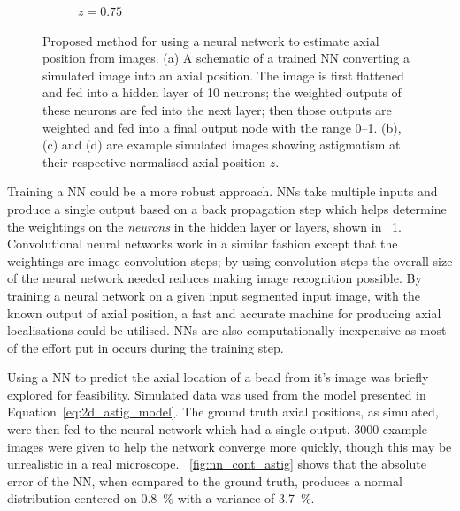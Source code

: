 \begin{figure}
\begin{subfigure}[t]{0.2\linewidth}
        \caption{\(z=0.75\)}
    \end{subfigure}
    \caption[Proposed method for using a neural network to estimate axial position from images.]{
    Proposed method for using a neural network to estimate axial position from images.
    (a) A schematic of a trained \gls{NN} converting a simulated image into an axial position.
    The image is first flattened and fed into a hidden layer of 10 neurons;
    the weighted outputs of these neurons are fed into the next layer;
    then those outputs are weighted and fed into a final output node with the range \SIrange{0}{1}{}.
    (b), (c) and (d) are example simulated images showing astigmatism at their respective normalised axial position \(z\).
    }\label{fig:nn_astig_scheme}
\end{figure}

Training a \gls{NN} could be a more robust approach.
\gls{NN}s take multiple inputs and produce a single output based on a back propagation step which helps determine the weightings on the \emph{neurons} in the hidden layer or layers, shown in \figurename~\ref{fig:nn_astig_scheme}.
Convolutional neural networks work in a similar fashion except that the weightings are image convolution steps; by using convolution steps the overall size of the neural network needed reduces making image recognition possible.
By training a neural network on a given input segmented input image, with the known output of axial position, a fast and accurate machine for producing axial localisations could be utilised.
\gls{NN}s are also computationally inexpensive as most of the effort put in occurs during the training step.

Using a \gls{NN} to predict the axial location of a bead from it's image was briefly explored for feasibility.
Simulated data was used from the model presented in Equation~\eqref{eq:2d_astig_model}.
The ground truth axial positions, as simulated, were then fed to the neural network which had a single output.
3000 example images were given to help the network converge more quickly, though this may be unrealistic in a real microscope.
\figurename~\ref{fig:nn_cont_astig} shows that the absolute error of the \gls{NN}, when compared to the ground truth, produces a normal distribution centered on \SI{0.8}{\percent} with a variance of \SI{3.7}{\percent}.

